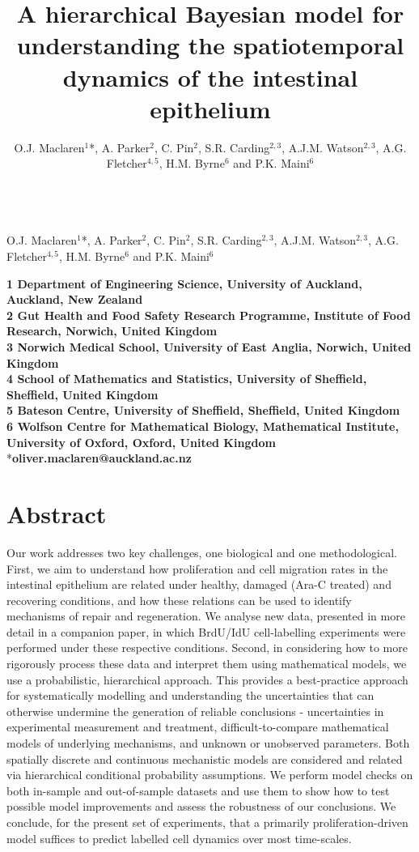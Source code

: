 \documentclass[10pt,letterpaper]{article}
\date{}
\title{A hierarchical Bayesian model for understanding the spatiotemporal
dynamics of the intestinal epithelium}
\author{O.J. Maclaren\(^1\)*, A. Parker\(^2\), C. Pin\(^2\), S.R.
Carding\(^{2,3}\), A.J.M. Watson\(^{2,3}\), A.G. Fletcher\(^{4,5}\),
H.M. Byrne\(^6\) and P.K. Maini\(^6\)}
\date{}
\begin{document}
\vspace*{0.35in}
\begin{flushleft}
{\Large
\textbf{}
}
\newline
\\
O.J. Maclaren\(^1\)*, A. Parker\(^2\), C. Pin\(^2\), S.R.
Carding\(^{2,3}\), A.J.M. Watson\(^{2,3}\), A.G. Fletcher\(^{4,5}\),
H.M. Byrne\(^6\) and P.K. Maini\(^6\)
\end{flushleft}


\textbf{1 Department of Engineering Science, University of Auckland,
Auckland, New Zealand}\\
\textbf{2 Gut Health and Food Safety Research Programme, Institute of
Food Research, Norwich, United Kingdom}\\
\textbf{3 Norwich Medical School, University of East Anglia, Norwich,
United Kingdom}\\
\textbf{4 School of Mathematics and Statistics, University of Sheffield,
Sheffield, United Kingdom}\\
\textbf{5 Bateson Centre, University of Sheffield, Sheffield, United
Kingdom}\\
\textbf{6 Wolfson Centre for Mathematical Biology, Mathematical
Institute, University of Oxford, Oxford, United Kingdom}\\
*\textbf{oliver.maclaren@auckland.ac.nz}

\section{Abstract}\label{abstract}

Our work addresses two key challenges, one biological and one
methodological. First, we aim to understand how proliferation and cell
migration rates in the intestinal epithelium are related under healthy,
damaged (Ara-C treated) and recovering conditions, and how these
relations can be used to identify mechanisms of repair and regeneration.
We analyse new data, presented in more detail in a companion paper, in
which BrdU/IdU cell-labelling experiments were performed under these
respective conditions. Second, in considering how to more rigorously
process these data and interpret them using mathematical models, we use
a probabilistic, hierarchical approach. This provides a best-practice
approach for systematically modelling and understanding the
uncertainties that can otherwise undermine the generation of reliable
conclusions - uncertainties in experimental measurement and treatment,
difficult-to-compare mathematical models of underlying mechanisms, and
unknown or unobserved parameters. Both spatially discrete and continuous
mechanistic models are considered and related via hierarchical
conditional probability assumptions. We perform model checks on both
in-sample and out-of-sample datasets and use them to show how to test
possible model improvements and assess the robustness of our
conclusions. We conclude, for the present set of experiments, that a
primarily proliferation-driven model suffices to predict labelled cell
dynamics over most time-scales.
\end{document}
